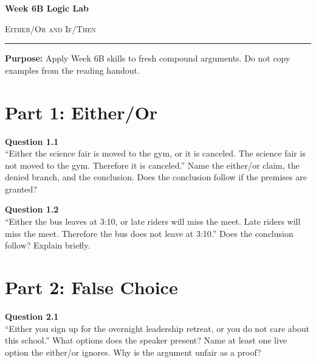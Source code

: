 \documentclass[12pt]{article}
\begin{document}
\begin{center}
{\LARGE\bfseries Week 6B Logic Lab}\par\vspace{0.05em}
{\large\scshape Either/Or and If/Then}\par\vspace{0.1em}
\rule{0.78\textwidth}{0.5pt}\par\vspace{0.15em}
\end{center}

\noindent\textbf{Purpose:} Apply Week 6B skills to fresh compound arguments. Do not copy examples from the reading handout.

\vspace{0.3em}

\section*{Part 1: Either/Or}

\textbf{Question 1.1}\\[-0.15em]
``Either the science fair is moved to the gym, or it is canceled. The science fair is not moved to the gym. Therefore it is canceled.'' Name the either/or claim, the denied branch, and the conclusion. Does the conclusion follow if the premises are granted?


\textbf{Question 1.2}\\[-0.15em]
``Either the bus leaves at 3:10, or late riders will miss the meet. Late riders will miss the meet. Therefore the bus does not leave at 3:10.'' Does the conclusion follow? Explain briefly.


\newpage

\section*{Part 2: False Choice}

\textbf{Question 2.1}\\[-0.15em]
``Either you sign up for the overnight leadership retreat, or you do not care about this school.'' What options does the speaker present? Name at least one live option the either/or ignores. Why is the argument unfair as a proof?


\newpage
\end{document}
